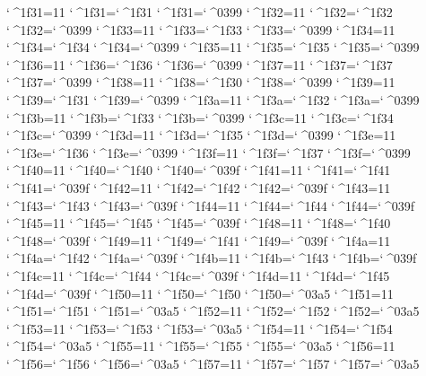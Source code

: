 \catcode`^^^^1f31=11 \lccode`^^^^1f31=`^^^^1f31 \uccode`^^^^1f31=`^^^^0399 
\catcode`^^^^1f32=11 \lccode`^^^^1f32=`^^^^1f32 \uccode`^^^^1f32=`^^^^0399 
\catcode`^^^^1f33=11 \lccode`^^^^1f33=`^^^^1f33 \uccode`^^^^1f33=`^^^^0399 
\catcode`^^^^1f34=11 \lccode`^^^^1f34=`^^^^1f34 \uccode`^^^^1f34=`^^^^0399 
\catcode`^^^^1f35=11 \lccode`^^^^1f35=`^^^^1f35 \uccode`^^^^1f35=`^^^^0399 
\catcode`^^^^1f36=11 \lccode`^^^^1f36=`^^^^1f36 \uccode`^^^^1f36=`^^^^0399 
\catcode`^^^^1f37=11 \lccode`^^^^1f37=`^^^^1f37 \uccode`^^^^1f37=`^^^^0399 
\catcode`^^^^1f38=11 \lccode`^^^^1f38=`^^^^1f30 \uccode`^^^^1f38=`^^^^0399 
\catcode`^^^^1f39=11 \lccode`^^^^1f39=`^^^^1f31 \uccode`^^^^1f39=`^^^^0399 
\catcode`^^^^1f3a=11 \lccode`^^^^1f3a=`^^^^1f32 \uccode`^^^^1f3a=`^^^^0399 
\catcode`^^^^1f3b=11 \lccode`^^^^1f3b=`^^^^1f33 \uccode`^^^^1f3b=`^^^^0399 
\catcode`^^^^1f3c=11 \lccode`^^^^1f3c=`^^^^1f34 \uccode`^^^^1f3c=`^^^^0399 
\catcode`^^^^1f3d=11 \lccode`^^^^1f3d=`^^^^1f35 \uccode`^^^^1f3d=`^^^^0399 
\catcode`^^^^1f3e=11 \lccode`^^^^1f3e=`^^^^1f36 \uccode`^^^^1f3e=`^^^^0399 
\catcode`^^^^1f3f=11 \lccode`^^^^1f3f=`^^^^1f37 \uccode`^^^^1f3f=`^^^^0399 
\catcode`^^^^1f40=11 \lccode`^^^^1f40=`^^^^1f40 \uccode`^^^^1f40=`^^^^039f 
\catcode`^^^^1f41=11 \lccode`^^^^1f41=`^^^^1f41 \uccode`^^^^1f41=`^^^^039f 
\catcode`^^^^1f42=11 \lccode`^^^^1f42=`^^^^1f42 \uccode`^^^^1f42=`^^^^039f 
\catcode`^^^^1f43=11 \lccode`^^^^1f43=`^^^^1f43 \uccode`^^^^1f43=`^^^^039f 
\catcode`^^^^1f44=11 \lccode`^^^^1f44=`^^^^1f44 \uccode`^^^^1f44=`^^^^039f 
\catcode`^^^^1f45=11 \lccode`^^^^1f45=`^^^^1f45 \uccode`^^^^1f45=`^^^^039f 
\catcode`^^^^1f48=11 \lccode`^^^^1f48=`^^^^1f40 \uccode`^^^^1f48=`^^^^039f 
\catcode`^^^^1f49=11 \lccode`^^^^1f49=`^^^^1f41 \uccode`^^^^1f49=`^^^^039f 
\catcode`^^^^1f4a=11 \lccode`^^^^1f4a=`^^^^1f42 \uccode`^^^^1f4a=`^^^^039f 
\catcode`^^^^1f4b=11 \lccode`^^^^1f4b=`^^^^1f43 \uccode`^^^^1f4b=`^^^^039f 
\catcode`^^^^1f4c=11 \lccode`^^^^1f4c=`^^^^1f44 \uccode`^^^^1f4c=`^^^^039f 
\catcode`^^^^1f4d=11 \lccode`^^^^1f4d=`^^^^1f45 \uccode`^^^^1f4d=`^^^^039f 
\catcode`^^^^1f50=11 \lccode`^^^^1f50=`^^^^1f50 \uccode`^^^^1f50=`^^^^03a5 
\catcode`^^^^1f51=11 \lccode`^^^^1f51=`^^^^1f51 \uccode`^^^^1f51=`^^^^03a5 
\catcode`^^^^1f52=11 \lccode`^^^^1f52=`^^^^1f52 \uccode`^^^^1f52=`^^^^03a5 
\catcode`^^^^1f53=11 \lccode`^^^^1f53=`^^^^1f53 \uccode`^^^^1f53=`^^^^03a5 
\catcode`^^^^1f54=11 \lccode`^^^^1f54=`^^^^1f54 \uccode`^^^^1f54=`^^^^03a5 
\catcode`^^^^1f55=11 \lccode`^^^^1f55=`^^^^1f55 \uccode`^^^^1f55=`^^^^03a5 
\catcode`^^^^1f56=11 \lccode`^^^^1f56=`^^^^1f56 \uccode`^^^^1f56=`^^^^03a5 
\catcode`^^^^1f57=11 \lccode`^^^^1f57=`^^^^1f57 \uccode`^^^^1f57=`^^^^03a5 
